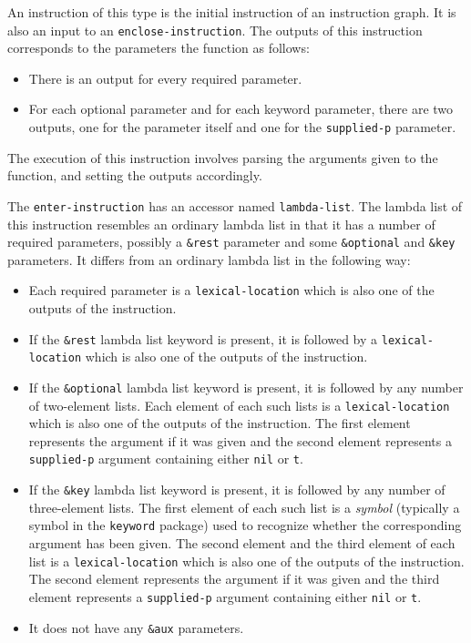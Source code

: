 An instruction of this type is the initial instruction of an
instruction graph.  It is also an input to an
\texttt{enclose-instruction}.  The outputs of this instruction
corresponds to the parameters the function as follows:

\begin{itemize}
\item There is an output for every required parameter.
\item For each optional parameter and for each keyword parameter,
  there are two outputs, one for the parameter itself and one for the
  \texttt{supplied-p} parameter.
\end{itemize}

The execution of this instruction involves parsing the arguments given
to the function, and setting the outputs accordingly.  

The \texttt{enter-instruction} has an accessor named
\texttt{lambda-list}.  The lambda list of this instruction resembles
an ordinary lambda list in that it has a number of required
parameters, possibly a \texttt{\&rest} parameter and some
\texttt{\&optional} and \texttt{\&key} parameters.  It differs from an
ordinary lambda list in the following way:

\begin{itemize}
\item Each required parameter is a \texttt{lexical-location} which is
  also one of the outputs of the instruction.
\item If the \texttt{\&rest} lambda list keyword is present, it is
  followed by a \texttt{lexical-location} which is also one of the
  outputs of the instruction.
\item If the \texttt{\&optional} lambda list keyword is present, it is
  followed by any number of two-element lists.  Each element of each
  such lists is a \texttt{lexical-location} which is also one of the
  outputs of the instruction.  The first element represents the
  argument if it was given and the second element represents a
  \texttt{supplied-p} argument containing either \texttt{nil} or
  \texttt{t}.
\item If the \texttt{\&key} lambda list keyword is present, it is
  followed by any number of three-element lists.  The first element of
  each such list is a \emph{symbol} (typically a symbol in the
  \texttt{keyword} package) used to recognize whether the
  corresponding argument has been given.  The second element and the
  third element of each list is a \texttt{lexical-location} which is
  also one of the outputs of the instruction.  The second element
  represents the argument if it was given and the third element
  represents a \texttt{supplied-p} argument containing either
  \texttt{nil} or \texttt{t}.
\item It does not have any \texttt{\&aux} parameters.
\end{itemize}


